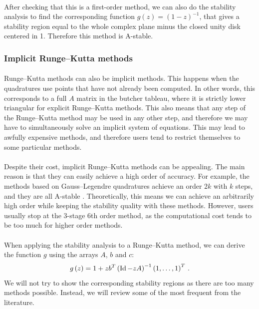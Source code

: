         \paragraph{}
        After checking that this is a first-order method, we can also do the stability analysis to find the corresponding function $g\left(z\right) = \left(1 - z\right)^{-1}$, that gives a stability region equal to the whole complex plane minus the closed unity disk centered in 1.
        Therefore this method is A-stable.


      \subsubsection{Implicit Runge--Kutta methods}

        \paragraph{}
        Runge--Kutta methods can also be implicit methods.
        This happens when the quadratures use points that have not already been computed.
        In other words, this corresponds to a full $A$ matrix in the butcher tableau, where it is strictly lower triangular for explicit Runge--Kutta methods.
        This also means that any step of the Runge--Kutta method may be used in any other step, and therefore we may have to simultaneously solve an implicit system of equations.
        This may lead to awfully expensive methods, and therefore users tend to restrict themselves to some particular methods.

        \paragraph{}
        Despite their cost, implicit Runge--Kutta methods can be appealing.
        The main reason is that they can easily achieve a high order of accuracy.
        For example, the methods based on Gauss--Legendre quadratures achieve an order $2k$ with $k$ steps, and they are all A-stable \cite{Iserles2008}.
        Theoretically, this means we can achieve an arbitrarily high order while keeping the stability quality with these methods.
        However, users usually stop at the 3-stage 6th order method, as the computational cost tends to be too much for higher order methods.

        \paragraph{}
        When applying the stability analysis to a Runge--Kutta method, we can derive the function $g$ using the arrays $A$, $b$ and $c$:
        \begin{equation}
          g\left(z\right) = 1 + z {b}^T \left(\operatorname{Id} - zA\right)^{-1} {\left(1, \dots, 1\right)}^T \ .
        \end{equation}
        We will not try to show the corresponding stability regions as there are too many methods possible.
        Instead, we will review some of the most frequent from the literature.

